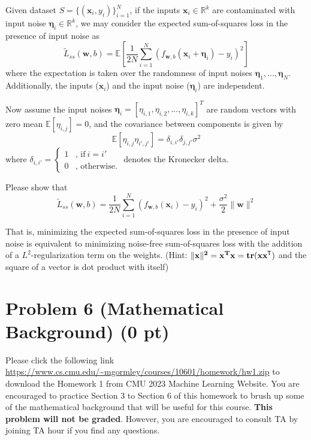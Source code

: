 \documentclass{article}
\newcommand*{\tran}{^{\mkern-1.5mu\mathsf{T}}}
\begin{document}
Given dataset $S = \{(\mathbf{x}_i,y_i)\}_{i=1}^N$, if the inputs $\mathbf{x}_i \in \mathbb{R}^k$ are contaminated with input noise $\boldsymbol{\eta}_i \in \mathbb{R}^k$, we may consider the expected sum-of-squares loss in the presence of input noise as 
$${\tilde L}_{ss}(\mathbf{w},b) = \mathbb{E}\left[ \frac{1}{2N}\sum_{i=1}^{N}\left(f_{\mathbf{w},b}(\mathbf{x}_i + \boldsymbol{\eta}_i)-y_i\right)^2 \right]$$
where the expectation is taken over the randomness of input noises $\boldsymbol{\eta}_1,...,\boldsymbol{\eta}_N$. Additionally, the inputs ($\mathbf{x}_i$) and the input noise ($\boldsymbol{\eta}_i$) are independent.

Now assume the input noises $\mathbf{\eta}_i = [\eta_{i,1}, \eta_{i,2}, ... ,\eta_{i,k}]^T$ are random vectors with zero mean $\mathbb{E}[\eta_{i,j}] = 0$, and the covariance between components is given by
$$\mathbb{E}[\eta_{i,j}\eta_{i',j'}] = \delta_{i,i'}\delta_{j,j'} \sigma^2$$
where $\delta_{i,i'} = \left\{\begin{array}{ll} 
1 & \mbox{, if} ~ i = i'\\
0 & \mbox{, otherwise.}
\end{array}\right.$ denotes the Kronecker delta. 

Please show that
$${\tilde L}_{ss}(\mathbf{w},b) = \frac{1}{2N}\sum_{i=1}^{N}\left(f_{\mathbf{w},b}(\mathbf{x}_i)-y_i\right)^2 + \frac{\sigma^2}{2}\|\mathbf{w}\|^2$$

That is, minimizing the expected sum-of-squares loss in the presence of input noise is equivalent to minimizing noise-free sum-of-squares loss with the addition of a $L^2$-regularization term on the weights.
(Hint: $\|\bf{x}\|^2 = {\bf x}^T{\bf x} = tr({\bf x}{\bf x}\tran)$ and the square of a vector is dot product with itself)




\section*{Problem 6 (Mathematical Background) (0 pt)}
Please click the following link \url{https://www.cs.cmu.edu/~mgormley/courses/10601/homework/hw1.zip}
to download the Homework 1 from CMU 2023 Machine Learning Website. You are encouraged to practice Section 3 to Section 6 of this homework to brush up some of the mathematical background that will be useful for this course. \textbf{This problem will not be graded}. However, you are encouraged to consult TA by joining TA hour if you find any questions.
\end{document}
